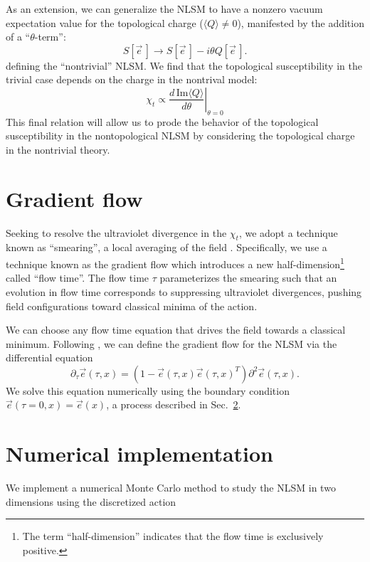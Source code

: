 \documentclass[a4paper,11pt]{article}
\newcommand{\e}{\vec e}
\begin{document}
As an extension, we can generalize the NLSM to have a nonzero vacuum expectation value for the topological charge ($\langle Q \rangle\neq0$), manifested by the addition of a ``$\theta$-term'':
\begin{equation*}
    S[\e\,] \rightarrow S[\e\,] - i \theta Q[\e\,].
\end{equation*}
defining the ``nontrivial'' NLSM. We find that the topological susceptibility in the trivial case depends on the charge in the nontrival model:
\begin{equation}
    \chi_t \propto \left. \frac{d\,\mathrm{Im}\langle Q \rangle}{d\theta}\right|_{\theta=0}
\end{equation}
This final relation will allow us to prode the behavior of the topological susceptibility in the nontopological NLSM by considering the topological charge in the nontrivial theory.










\section{Gradient flow}
\label{sec:gradflow}
Seeking to resolve the ultraviolet divergence in the $\chi_{t}$, we adopt a technique known as ``smearing'', a local averaging of the field \cite{solbrig2008}. Specifically, we use a technique known as the gradient flow \cite{monahan2015} which introduces a new half-dimension\footnote{The term ``half-dimension'' indicates that the flow time is exclusively positive.} called ``flow time''.  The flow time $\tau$ parameterizes the smearing such that an evolution in flow time corresponds to suppressing ultraviolet divergences, pushing field configurations toward classical minima of the action.

We can choose any flow time equation that drives the field towards a classical minimum. Following \cite{bietenholz2018}, we can define the gradient flow for the NLSM via the differential equation
\begin{equation}
    \label{eq:nsm_gradflow}
  \partial_\tau \e (\tau,x) = \left( 1 - \e(\tau,x) \e(\tau,x)^T \right) \partial^2 \e(\tau,x).
\end{equation}
We solve this equation numerically using the boundary condition $\e(\tau=0,x) = \e(x)$, a process described in Sec.~\ref{sec:numerics}.

\section{Numerical implementation}
\label{sec:numerics}
We implement a numerical Monte Carlo method to study the NLSM in two dimensions using the discretized action
\end{document}
